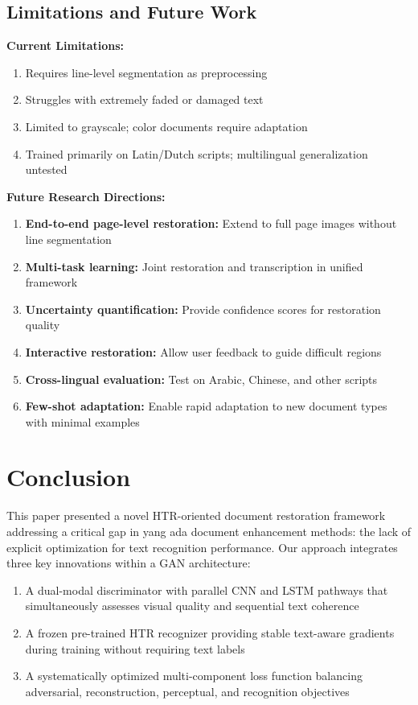 \documentclass[journal]{IEEEtran}
\begin{document}
\subsection{Limitations and Future Work}

\textbf{Current Limitations:}
\begin{enumerate}
    \item Requires line-level segmentation as preprocessing
    \item Struggles with extremely faded or damaged text
    \item Limited to grayscale; color documents require adaptation
    \item Trained primarily on Latin/Dutch scripts; multilingual generalization untested
\end{enumerate}

\textbf{Future Research Directions:}
\begin{enumerate}
    \item \textbf{End-to-end page-level restoration:} Extend to full page images without line segmentation
    \item \textbf{Multi-task learning:} Joint restoration and transcription in unified framework
    \item \textbf{Uncertainty quantification:} Provide confidence scores for restoration quality
    \item \textbf{Interactive restoration:} Allow user feedback to guide difficult regions
    \item \textbf{Cross-lingual evaluation:} Test on Arabic, Chinese, and other scripts
    \item \textbf{Few-shot adaptation:} Enable rapid adaptation to new document types with minimal examples
\end{enumerate}

\section{Conclusion}

This paper presented a novel HTR-oriented document restoration framework addressing a critical gap in yang ada document enhancement methods: the lack of explicit optimization for text recognition performance. Our approach integrates three key innovations within a GAN architecture:

\begin{enumerate}
    \item A dual-modal discriminator with parallel CNN and LSTM pathways that simultaneously assesses visual quality and sequential text coherence
    \item A frozen pre-trained HTR recognizer providing stable text-aware gradients during training without requiring text labels
    \item A systematically optimized multi-component loss function balancing adversarial, reconstruction, perceptual, and recognition objectives
\end{enumerate}
\end{document}
